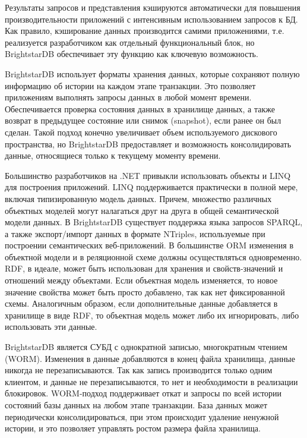 \documentclass[a4paper,14pt,openany,final]{extreport} %
\begin{document}

Результаты запросов и представления кэшируются автоматически для повышения производительности приложений с интенсивным использованием запросов к БД. Как правило, кэширование данных производится самими приложениями, т.е. реализуется разработчиком как отдельный функциональный блок, но BrightstarDB обеспечивает эту функцию как ключевую возможность.

BrightstarDB использует форматы хранения данных, которые сохраняют полную информацию об истории на каждом этапе транзакции. Это позволяет приложениям выполнять запросы данных в любой момент времени. Обеспечивается проверка состояния данных в хранилище данных, а также  возврат в предыдущее состояние или снимок (snapshot), если ранее он был сделан. Такой подход конечно увеличивает объем используемого дискового пространства, но BrightstarDB предоставляет и возможность консолидировать данные, относящиеся только к текущему моменту времени.

Большинство разработчиков на .NET привыкли использовать объекты и LINQ для построения приложений. LINQ поддерживается практически в полной мере, включая типизированную модель данных.  Причем, множество различных объектных моделей могут налагаться друг на друга в общей семантической модели данных. В BrightstarDB существует поддержка языка запросов SPARQL, а также экспорт/импорт данных в формате NTriples, используемые при построении семантических веб-приложений. В большинстве ORM изменения в объектной модели и в реляционной схеме должны осуществляться одновременно. RDF, в идеале, может быть использован для хранения и свойств-значений и отношений между объектами. Если объектная модель изменяется, то новое значение свойства может быть просто добавлено, так как нет фиксированной схемы. Аналогичным образом, если дополнительные данные добавляется в хранилище в виде RDF, то объектная модель может либо их игнорировать, либо использовать эти данные.

BrightstarDB является СУБД с однократной записью, многократным чтением (WORM). Изменения в данные добавляются в конец файла хранилища, данные никогда не перезаписываются.  Так как запись производится только одним клиентом, и данные не перезаписываются, то нет и необходимости в реализации блокировок. WORM-подход поддерживает откат и запросы по всей истории состояний базы данных на любом этапе транзакции. База данных может периодически консолидироваться, при этом происходит удаление ненужной истории, и это позволяет управлять ростом размера файла хранилища.
\end{document}
